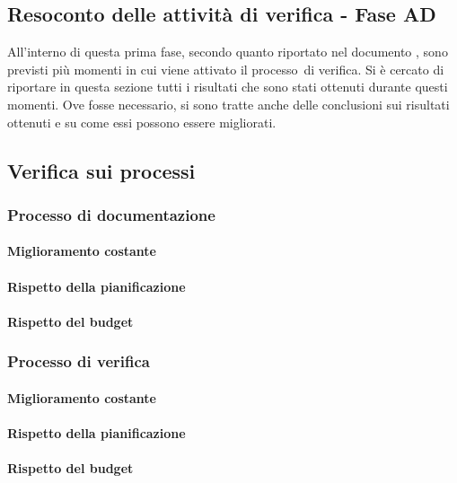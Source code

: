 \documentclass[../PianoDiQualifica.tex]{subfiles}
\begin{document}
\begin{appendices}
\section{Resoconto delle attività di verifica - Fase AD}
All'interno di questa prima fase\g, secondo quanto riportato nel documento \pianodiprogettov, sono previsti più momenti in cui viene attivato il processo\g\ di verifica. Si è cercato di riportare in questa sezione tutti i risultati che sono stati ottenuti durante questi momenti. Ove fosse necessario, si sono tratte anche delle conclusioni sui risultati ottenuti e su come essi possono essere migliorati.
	
	\subsection{Verifica sui processi}
		\subsubsection{Processo di documentazione}
			\paragraph{Miglioramento costante}
			
			\paragraph{Rispetto della pianificazione}
			
			\paragraph{Rispetto del budget}
			
		\subsubsection{Processo di verifica}
			\paragraph{Miglioramento costante}
			
			\paragraph{Rispetto della pianificazione}
			
			\paragraph{Rispetto del budget}
			

\end{appendices}
\end{document}
